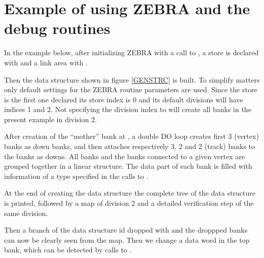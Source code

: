 \chapter{Example of using ZEBRA and the debug routines}
\label{sec:h1dzexamples}

In the example below, after initializing ZEBRA with a call to ,
a store is declared with  and a link area with .

Then the data structure shown in figure \ref{GENSTRC} is built.
To simplify matters only default
settings for the ZEBRA routine parameters are used. 
Since the store
is the first one declared its store index is 0 and its default
divisions will have indices 1 and 2. 
Not specifying the division index
to  will create all banks in the present example in division 2.

After creation of the ``mother'' bank at , 
a double DO loop
creates first 3  (vertex) banks
as down banks, and then attaches respectively 3, 2 and 2 
(track) banks to the  banks as downs. 
All  banks and the  banks
connected to a given vertex
are grouped together in a linear structure.
The data part of each bank is filled with information of a type specified
in the calls to .

At the end of creating the data structure 
the complete tree of the  data structure is printed,
followed by a map of division 2 and a detailed verification step 
of the same division.

Then a  branch of the data structure id dropped with 
and the droppped banks can now be clearly seen from the map. Then we change
a data word in the top bank, which can be detected by calls to .

